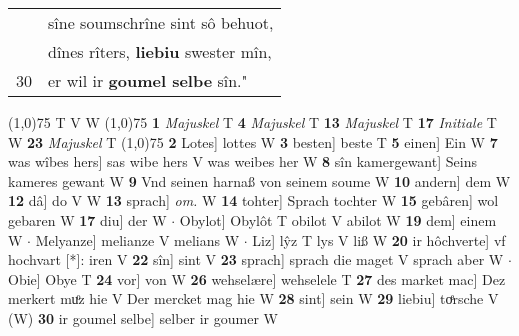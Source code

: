 \documentclass[8pt,a4paper,notitlepage]{article}
\begin{document}
\begin{table}[ht]
\begin{minipage}[t]{0.5\linewidth}
\begin{tabular}{rl}
 & sîne soumschrîne sint sô behuot,\\ 
 & dînes rîters, \textbf{liebiu} swester mîn,\\ 
30 & er wil ir \textbf{goumel selbe} sîn."\\ 
\end{tabular}
\scriptsize
\line(1,0){75} \newline
T V W \newline
\line(1,0){75} \newline
\textbf{1} \textit{Majuskel} T  \textbf{4} \textit{Majuskel} T  \textbf{13} \textit{Majuskel} T  \textbf{17} \textit{Initiale} T W  \textbf{23} \textit{Majuskel} T  \newline
\line(1,0){75} \newline
\textbf{2} Lotes] lottes W \textbf{3} besten] beste T \textbf{5} einen] Ein W \textbf{7} was wîbes hers] sas wibe hers V was weibes her W \textbf{8} sîn kamergewant] Seins kameres gewant W \textbf{9} Vnd seinen harnaß von seinem soume W \textbf{10} andern] dem W \textbf{12} dâ] do V W \textbf{13} sprach] \textit{om.} W \textbf{14} tohter] Sprach tochter W \textbf{15} gebâren] wol gebaren W \textbf{17} diu] der W  $\cdot$ Obylot] Obylôt T obilot V abilot W \textbf{19} dem] einem W  $\cdot$ Melyanze] melianze V melians W  $\cdot$ Liz] lŷz T lys V liß W \textbf{20} ir hôchverte] vf hochvart [*]: iren V \textbf{22} sîn] sint V \textbf{23} sprach] sprach die maget V sprach aber W  $\cdot$ Obie] Obye T \textbf{24} vor] von W \textbf{26} wehselære] wehselele T \textbf{27} des market mac] Dez merkert muͦz hie V Der mercket mag hie W \textbf{28} sint] sein W \textbf{29} liebiu] toͤrsche V (W) \textbf{30} ir goumel selbe] selber ir goumer W \newline
\end{minipage}
\end{table}
\end{document}
